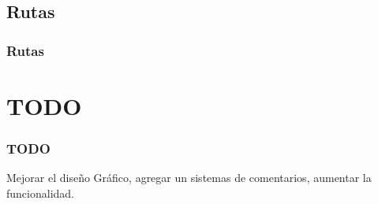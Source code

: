 \documentclass[12pt]{beamer}
\begin{document}
\subsection{Rutas}

\begin{frame}
 \frametitle{Rutas}
 
\end{frame}



\section{TODO}

\begin{frame}
 \frametitle{TODO}
 Mejorar el diseño Gráfico, agregar un sistemas de comentarios, aumentar la funcionalidad.
\end{frame}


\end{document}
